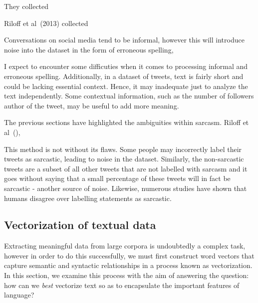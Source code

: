 \documentclass[12pt,a4paper]{article}
\begin{document}
They collected 



Riloff et al\ (2013) \cite{riloff2013sarcasm} collected 



Conversations on social media tend to be informal, however this will introduce noise into the dataset in the form of erroneous spelling, 

I expect to encounter some difficuties when it comes to processing informal and erroneous spelling. Additionally, in a dataset of tweets, text is fairly short and could be lacking essential context. Hence, it may inadequate just to analyze the text independently. Some contextual information, such as the number of followers author of the tweet, may be useful to add more meaning.

\noindent The previous sections have highlighted the ambiguities within sarcasm. 
Riloff et al\ (), 


This method is not without its flaws. Some people may incorrectly label their tweets as sarcastic, leading to noise in the dataset. Similarly, the non-sarcastic tweets are a subset of all other tweets that are not labelled with sarcasm and it goes without saying that a small percentage of these tweets will in fact be sarcastic - another source of noise.
Likewise, numerous studies have shown that humans disagree over labelling statements as sarcastic.

\vfill

\subsection{Vectorization of textual data}
\noindent Extracting meaningful data from large corpora is undoubtedly a complex task, however in order to do this successfully, we must first construct word vectors that capture semantic and syntactic relationships in a process known as vectorization. In this section, we examine this process with the aim of answering the question: how can we \textit{best} vectorize text so as to encapsulate the important features of language?
\end{document}
